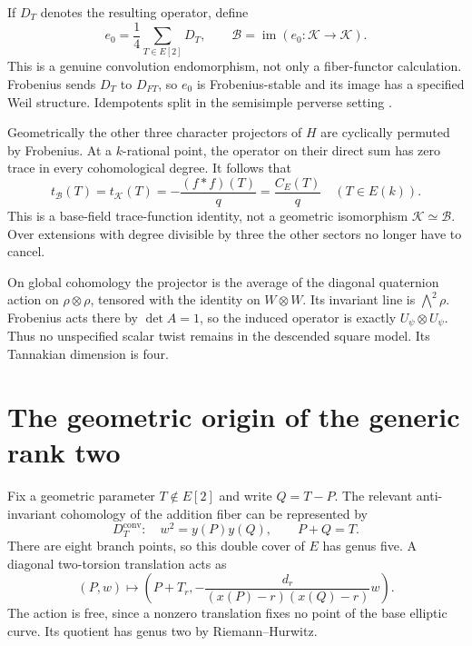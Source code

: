 \documentclass[11pt,a4paper]{article}
\numberwithin{equation}{section}
\newcommand{\im}{\operatorname{im}}
\newcommand{\B}{\mathcal B}
\begin{document}
If $D_T$ denotes the resulting operator, define
\begin{equation}\label{eq:projector}
 \boxed{e_0=\frac14\sum_{T\in E[2]}D_T,\qquad
 \B=\im(e_0:\mathcal K\to\mathcal K).}
\end{equation}
This is a genuine convolution endomorphism, not only a fiber-functor calculation. Frobenius sends $D_T$ to $D_{FT}$, so $e_0$ is Frobenius-stable and its image has a specified Weil structure. Idempotents split in the semisimple perverse setting \cite{CDRS}.

Geometrically the other three character projectors of $H$ are cyclically permuted by Frobenius. At a $k$-rational point, the operator on their direct sum has zero trace in every cohomological degree. It follows that
\begin{equation}\label{eq:tracefunction}
 \boxed{t_{\B}(T)=t_{\mathcal K}(T)
       =-\frac{(f*f)(T)}q=\frac{C_E(T)}q
       \quad(T\in E(k)).}
\end{equation}
This is a base-field trace-function identity, not a geometric isomorphism $\mathcal K\simeq\B$. Over extensions with degree divisible by three the other sectors no longer have to cancel.

On global cohomology the projector is the average of the diagonal quaternion action on $\rho\otimes\rho$, tensored with the identity on $W\otimes W$. Its invariant line is $\bigwedge^2\rho$. Frobenius acts there by $\det A=1$, so the induced operator is exactly $U_\psi\otimes U_\psi$. Thus no unspecified scalar twist remains in the descended square model. Its Tannakian dimension is four.

\section{The geometric origin of the generic rank two}
Fix a geometric parameter $T\notin E[2]$ and write $Q=T-P$. The relevant anti-invariant cohomology of the addition fiber can be represented by
\begin{equation}
 D_T^{\mathrm{conv}}:\quad w^2=y(P)y(Q),\qquad P+Q=T.
\end{equation}
There are eight branch points, so this double cover of $E$ has genus five. A diagonal two-torsion translation acts as
\begin{equation}\label{eq:diag}
 (P,w)\longmapsto
 \left(P+T_r,-\frac{d_r}{(x(P)-r)(x(Q)-r)}w\right).
\end{equation}
The action is free, since a nonzero translation fixes no point of the base elliptic curve. Its quotient has genus two by Riemann--Hurwitz.
\end{document}
